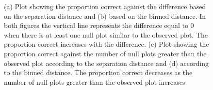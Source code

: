 \documentclass[12]{article}
\begin{document}
\begin{figure}[hbtp]
{\label{lpcomp_2}
}
\label{lp-comp}
	\vspace{-.1in}
\caption[Optional caption for list of figures]{(a) Plot showing the proportion correct against the difference based on the separation distance and (b) based on the binned distance. In both figures the vertical line represents the difference equal to 0 when there is at least one null plot similar to the observed plot. The proportion correct increases with the difference. (c) Plot showing the proportion correct against the number of null plots greater than the observed plot according to the separation distance and (d) according to the binned distance. The proportion correct decreases as the number of null plots greater than the observed plot increases.}
\end{figure}
\end{document}
